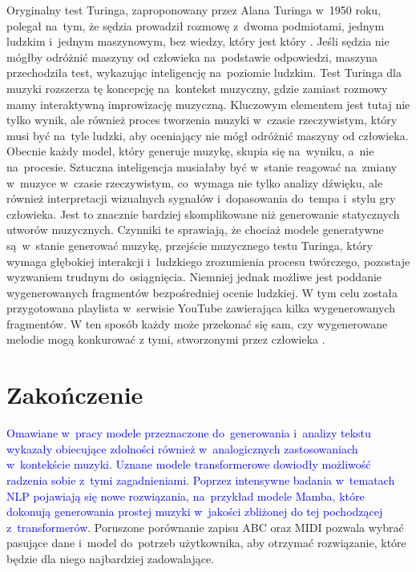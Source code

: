 \documentclass[data-science]{agh-wi} %
\begin{document}
Oryginalny test Turinga, zaproponowany przez Alana Turinga w~1950 roku, polegał na~tym, że sędzia prowadził rozmowę z~dwoma podmiotami, jednym ludzkim i~jednym maszynowym, bez wiedzy, który jest który \cite{turing_test}. Jeśli sędzia nie mógłby odróżnić maszyny od człowieka na~podstawie odpowiedzi, maszyna przechodziła test, wykazując inteligencję na~poziomie ludzkim. Test Turinga dla muzyki rozszerza tę koncepcję na~kontekst muzyczny, gdzie zamiast rozmowy mamy interaktywną improwizację muzyczną. Kluczowym elementem jest tutaj nie tylko wynik, ale również proces tworzenia muzyki w~czasie rzeczywistym, który musi być na~tyle ludzki, aby oceniający nie mógł odróżnić maszyny od człowieka. Obecnie każdy model, który generuje muzykę, skupia się na~wyniku, a~nie na~procesie. Sztuczna inteligencja musiałaby być w~stanie reagować na~zmiany w~muzyce w~czasie rzeczywistym, co~wymaga nie tylko analizy dźwięku, ale również interpretacji wizualnych sygnałów i~dopasowania do~tempa i~stylu gry człowieka. Jest to znacznie bardziej skomplikowane niż generowanie statycznych utworów muzycznych. Czynniki te sprawiają, że chociaż modele generatywne są~w~stanie generować muzykę, przejście muzycznego testu Turinga, który wymaga głębokiej interakcji i~ludzkiego zrozumienia procesu twórczego, pozostaje wyzwaniem trudnym do~osiągnięcia. Niemniej jednak możliwe jest poddanie wygenerowanych fragmentów bezpośredniej ocenie ludzkiej. W tym celu została przygotowana playlista w~serwisie YouTube zawierająca kilka wygenerowanych fragmentów. W ten sposób każdy może przekonać się sam, czy wygenerowane melodie mogą konkurować z tymi, stworzonymi przez człowieka \cite*{playlist}.

\chapter{Zakończenie}

\textcolor{blue}{Omawiane w~pracy modele przeznaczone do~generowania i~analizy tekstu wykazały obiecujące zdolności również w~analogicznych zastosowaniach w~kontekście muzyki. Uznane modele transformerowe dowiodły możliwość radzenia sobie z~tymi zagadnieniami. Poprzez intensywne badania w~tematach NLP pojawiają się nowe rozwiązania, na~przykład modele Mamba, które dokonują generowania prostej muzyki w~jakości zbliżonej do tej pochodzącej z~transformerów.} Poruszone porównanie zapisu ABC oraz MIDI pozwala wybrać pasujące dane i~model do~potrzeb użytkownika, aby otrzymać rozwiązanie, które będzie dla niego najbardziej zadowalające.
\end{document}
